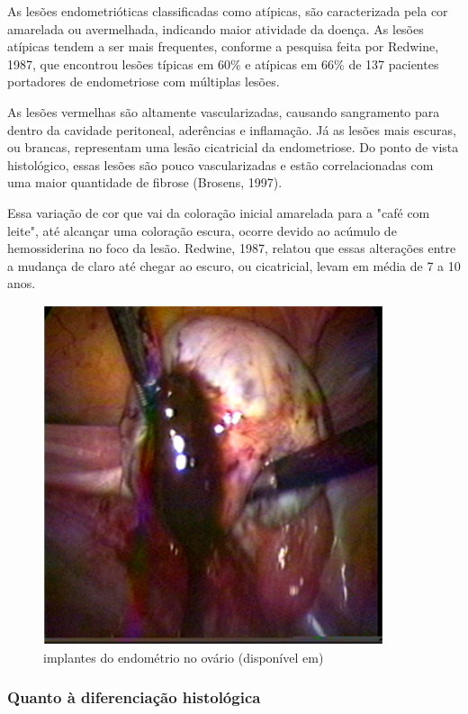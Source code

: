 \documentclass[12pt]{article} %
\begin{document}
As lesões endometrióticas classificadas como atípicas, são
caracterizada pela cor amarelada ou avermelhada, indicando maior
atividade da doença. As lesões atípicas tendem a ser mais frequentes,
conforme a pesquisa feita por Redwine, 1987, que encontrou lesões
típicas em 60\% e atípicas em 66\% de 137 pacientes portadores de
endometriose com múltiplas lesões.

As lesões vermelhas são altamente vascularizadas, causando sangramento
para dentro da cavidade peritoneal, aderências e inflamação. Já as
lesões mais escuras, ou brancas, representam uma lesão cicatricial
da endometriose. Do ponto de vista histológico, essas lesões são pouco
vascularizadas e estão correlacionadas com uma maior quantidade de
fibrose (Brosens, 1997).

Essa variação de cor que vai da coloração
inicial amarelada para a "café com leite", até alcançar uma coloração
escura, ocorre devido ao acúmulo de hemossiderina no
foco da lesão. Redwine, 1987, relatou que essas alterações entre a
mudança de claro até chegar ao escuro, ou cicatricial, levam em média
de 7 a 10 anos.


\begin{figure}[h!] 
\centering
\includegraphics[width=10cm]{endometriomaroto.jpg}
\caption[Endometriose: implantes do endométrio no ovário] {implantes do endométrio no ovário (disponível em)}
\label{implantes do endometrio}
\end{figure} 


\subsubsection{Quanto à diferenciação histológica}
\end{document}
